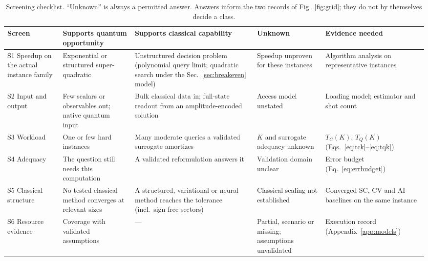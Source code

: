 \begin{table}[htbp]
\centering\scriptsize
\setlength{\tabcolsep}{4pt}
\caption{Screening checklist. ``Unknown'' is always a permitted answer. Answers inform the two records of Fig.~\ref{fig:grid}; they do not by themselves decide a class.}\label{tab:checklist}
\begin{tabular}{@{}L{3.1cm} >{}L{3.0cm} >{}L{3.0cm} >{}L{2.5cm} L{3.2cm}@{}}
\toprule
Screen & Supports quantum opportunity & Supports classical capability & Unknown & Evidence needed\\\midrule
S1 Speedup on the actual instance family & Exponential or structured super-quadratic & Unstructured decision problem (polynomial query limit; quadratic search under the Sec.~\ref{sec:breakeven} model) & Speedup unproven for these instances & Algorithm analysis on representative instances\\
S2 Input and output & Few scalars or observables out; native quantum input & Bulk classical data in; full-state readout from an amplitude-encoded solution & Access model unstated & Loading model; estimator and shot count\\
S3 Workload & One or few hard instances & Many moderate queries a validated surrogate amortizes & $K$ and surrogate adequacy unknown & $T_C(K)$, $T_Q(K)$ (Eqs.~\ref{eq:tck}--\ref{eq:tqk})\\
S4 Adequacy & The question still needs this computation & A validated reformulation answers it & Validation domain unclear & Error budget (Eq.~\ref{eq:errbudget})\\
S5 Classical structure & No tested classical method converges at relevant sizes & A structured, variational or neural method reaches the tolerance (incl.\ sign-free sectors) & Classical scaling not established & Converged SC, CV and AI baselines on the same instance\\
S6 Resource evidence & Coverage \mtC{} with validated assumptions & --- & Partial, scenario or missing; assumptions unvalidated & Execution record (Appendix~\ref{app:models})\\
\bottomrule
\end{tabular}
\end{table}
